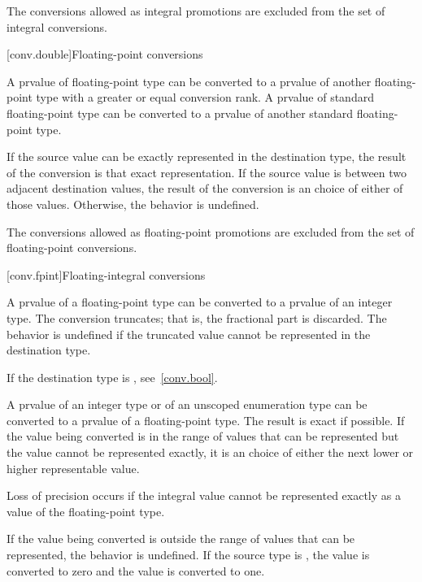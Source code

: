\pnum
The conversions allowed as integral promotions are excluded from the set
of integral conversions.

[conv.double]{Floating-point conversions}

\pnum
{}%
A prvalue of floating-point type can be converted to a prvalue of
another floating-point type
with a greater or equal conversion rank.
A prvalue of standard floating-point type can be converted to
a prvalue of another standard floating-point type.

\pnum
If the source value can be exactly
represented in the destination type, the result of the conversion is
that exact representation. If the source value is between two adjacent
destination values, the result of the conversion is an
 choice of either of those values.
Otherwise, the behavior is undefined.

\pnum
The conversions allowed as floating-point promotions are excluded from
the set of floating-point conversions.

[conv.fpint]{Floating-integral conversions}

\pnum
{}%
A prvalue of a floating-point type can be converted to a prvalue of an
integer type. The conversion truncates; that is, the fractional part is
discarded.
%
The behavior is undefined if the truncated value cannot be represented
in the destination type.
\begin{note}
If the destination type is , see~\ref{conv.bool}.
\end{note}

\pnum
{}%
%
%
A prvalue of an integer type or of an unscoped enumeration type can be converted to
a prvalue of a floating-point type. The result is exact if possible. If the value being
converted is in the range of values that can be represented but the value cannot be
represented exactly, it is an  choice of either the next lower or higher representable
value.
\begin{note}
Loss of precision occurs if the integral value cannot be represented
exactly as a value of the floating-point type.
\end{note}
If the value being converted is
outside the range of values that can be represented, the behavior is undefined. If the
source type is , the value  is converted to zero and the value
 is converted to one.

